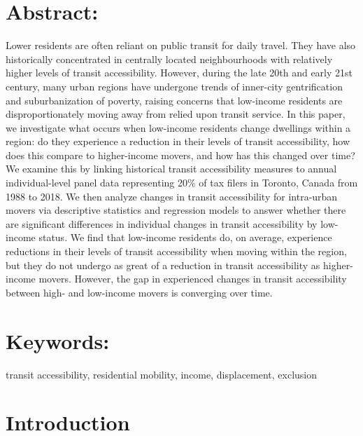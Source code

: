 \section*{{Abstract:}}


	Lower residents are often reliant on public transit for daily travel. They have also historically concentrated in centrally located neighbourhoods with relatively higher levels of transit accessibility. However, during the late 20th and early 21st century, many urban regions have undergone trends of inner-city gentrification and suburbanization of poverty, raising concerns that low-income residents are disproportionately moving away from relied upon transit service. In this paper, we investigate what occurs when low-income residents change dwellings within a region: do they experience a reduction in their levels of transit accessibility, how does this compare to higher-income movers, and how has this changed over time? We examine this by linking historical transit accessibility measures to annual individual-level panel data representing 20\% of tax filers in Toronto, Canada from 1988 to 2018. We then analyze changes in transit accessibility for intra-urban movers via descriptive statistics and regression models to answer whether there are significant differences in individual changes in transit accessibility by low-income status. We find that low-income residents do, on average, experience reductions in their levels of transit accessibility when moving within the region, but they do not undergo as great of a reduction in transit accessibility as higher-income movers. However, the gap in experienced changes in transit accessibility between high- and low-income movers is converging over time.


\section*{{Keywords:}}

transit accessibility, residential mobility, income, displacement, exclusion



\section{Introduction}

